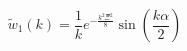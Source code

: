 \documentclass[letterpaper,twocolumn,amsmath,amssymb,prb]{revtex4-1}
\begin{document}
\begin{widetext}
\begin{equation}
    \widetilde{w}_1(k)=\frac{1}{k}e^{-\frac{k^2\Xi^2}{8}}\sin\left(\frac{k\alpha}{2}\right)
\end{equation}


\end{widetext}
\end{document}
